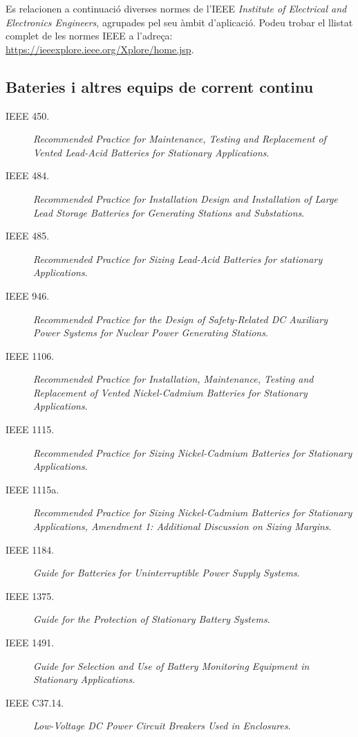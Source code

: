Es relacionen a continuació diverses normes de l'IEEE \textit{Institute of Electrical and Electronics Engineers}, agrupades pel seu àmbit d'aplicació. Podeu trobar el llistat complet de les normes IEEE a l'adreça: \href{https://ieeexplore.ieee.org/Xplore/home.jsp}{https://ieeexplore.ieee.org/Xplore/home.jsp}.

\subsection*{Bateries i altres equips de corrent continu}
\begin{description}
    \item [\hspace{5mm}IEEE 450.] \textit{Recommended Practice for  Maintenance, Testing and Replacement of Vented Lead-Acid Batteries for Stationary Applications}.
    \item [\hspace{5mm}IEEE 484.] \textit{Recommended Practice for Installation Design and Installation of Large Lead Storage Batteries for Generating Stations and Substations}.
    \item [\hspace{5mm}IEEE 485.] \textit{Recommended Practice for Sizing Lead-Acid Batteries for stationary Applications}.
    \item [\hspace{5mm}IEEE 946.] \textit{Recommended Practice for the Design of Safety-Related DC Auxiliary Power Systems for Nuclear Power Generating Stations}.
    \item [\hspace{5mm}IEEE 1106.] \textit{Recommended Practice for Installation, Maintenance, Testing and Replacement of Vented Nickel-Cadmium Batteries for Stationary Applications}.
    \item [\hspace{5mm}IEEE 1115.] \textit{Recommended Practice for Sizing Nickel-Cadmium Batteries for Stationary Applications}.
    \item [\hspace{5mm}IEEE 1115a.] \textit{Recommended Practice for Sizing Nickel-Cadmium Batteries for Stationary Applications, Amendment 1: Additional Discussion on Sizing Margins}.
    \item [\hspace{5mm}IEEE 1184.] \textit{Guide for Batteries for Uninterruptible Power Supply Systems}.
    \item [\hspace{5mm}IEEE 1375.] \textit{Guide for the Protection of Stationary Battery Systems}.
    \item [\hspace{5mm}IEEE 1491.] \textit{Guide for Selection and Use of Battery Monitoring Equipment in Stationary Applications}.
    \item [\hspace{5mm}IEEE C37.14.] \textit{Low-Voltage DC Power Circuit Breakers Used in Enclosures}.
\end{description}


